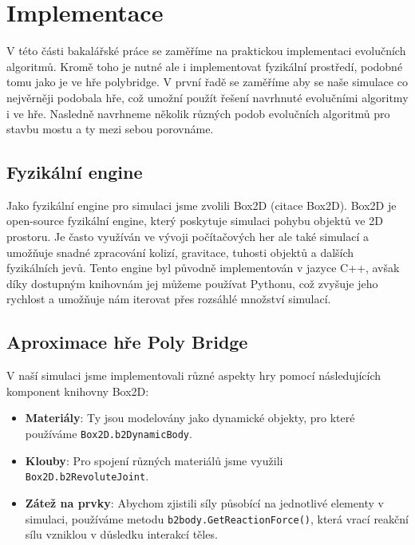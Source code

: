 \chapter{Implementace}

V této části bakalářské práce se zaměříme na praktickou implementaci evolučních algoritmů. Kromě toho je nutné ale i implementovat fyzikální prostředí, podobné tomu jako je ve hře polybridge. V první řadě se zaměříme aby se naše simulace co nejvěrněji podobala hře, což umožní použít řešení navrhnuté evolučními algoritmy i ve hře. Nasledně navrhneme několik různých podob evolučních algoritmů pro stavbu mostu a ty mezi sebou porovnáme.




\section{Fyzikální engine}

Jako fyzikální engine pro simulaci jsme zvolili Box2D (citace Box2D). Box2D je open-source fyzikální engine, který poskytuje simulaci pohybu objektů ve 2D prostoru. Je často využíván ve vývoji počítačových her ale také simulací a umožňuje snadné zpracování kolizí, gravitace, tuhosti objektů a dalších fyzikálních jevů. Tento engine byl původně implementován v jazyce C++, avšak díky dostupným knihovnám jej můžeme používat Pythonu, což zvyšuje jeho rychlost a umožňuje nám iterovat přes rozsáhlé množství simulací.

\section{Aproximace hře Poly Bridge}

V naší simulaci jsme implementovali různé aspekty hry pomocí následujících komponent knihovny Box2D:

\begin{itemize}
    \item \textbf{Materiály}: Ty jsou modelovány jako dynamické objekty, pro které používáme \texttt{Box2D.b2DynamicBody}.
    \item \textbf{Klouby}: Pro spojení různých materiálů jsme využili \texttt{Box2D.b2RevoluteJoint}.
    \item \textbf{Zátež na prvky}: Abychom zjistili síly působící na jednotlivé elementy v simulaci, používáme metodu \texttt{b2body.GetReactionForce()}, která vrací reakční sílu vzniklou v důsledku interakcí těles.
\end{itemize}

